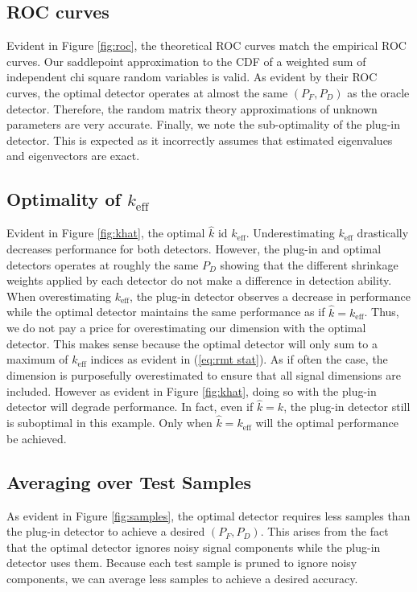 \subsection{ROC curves}

Evident in Figure \ref{fig:roc}, the theoretical ROC curves match the empirical ROC curves. Our saddlepoint approximation to the CDF of a weighted sum of independent chi square random variables is valid. As evident by their ROC curves, the optimal detector operates at almost the same $(P_F, P_D)$ as the oracle detector. Therefore, the random matrix theory approximations of unknown parameters are very accurate. Finally, we note the sub-optimality of the plug-in detector. This is expected as it incorrectly assumes that estimated eigenvalues and eigenvectors are exact.

\subsection{Optimality of $k_\text{eff}$}

Evident in Figure \ref{fig:khat}, the optimal $\widehat{k}$ id $k_\text{eff}$. Underestimating $k_\text{eff}$ drastically decreases performance for both detectors. However, the plug-in and optimal detectors operates at roughly the same $P_D$ showing that the different shrinkage weights applied by each detector do not make a difference in detection ability. When overestimating $k_\text{eff}$, the plug-in detector observes a decrease in performance while the optimal detector maintains the same performance as if $\widehat{k}=k_\text{eff}$. Thus, we do not pay a price for overestimating our dimension with the optimal detector. This makes sense because the optimal detector will only sum to a maximum of $k_\text{eff}$ indices as evident in (\ref{eq:rmt stat}). As if often the case, the dimension is purposefully overestimated to ensure that all signal dimensions are included. However as evident in Figure \ref{fig:khat}, doing so with the plug-in detector will degrade performance. In fact, even if $\widehat{k}=k$, the plug-in detector still is suboptimal in this example. Only when $\widehat{k}=k_\text{eff}$ will the optimal performance be achieved.

\subsection{Averaging over Test Samples}

As evident in Figure \ref{fig:samples}, the optimal detector requires less samples than the plug-in detector to achieve a desired $(P_F, P_D)$. This arises from the fact that the optimal detector ignores noisy signal components while the plug-in detector uses them. Because each test sample is pruned to ignore noisy components, we can average less samples to achieve a desired accuracy.

